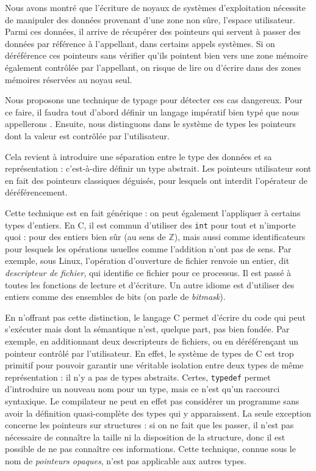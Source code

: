 
Nous avons montré que l'écriture de noyaux de systèmes d'exploitation nécessite
de manipuler des données provenant d'une zone non sûre, l'espace utilisateur.
Parmi ces données, il arrive de récupérer des pointeurs qui servent à passer des
données par référence à l'appellant, dans certains appels systèmes. Si on
déréférence ces pointeurs sans vérifier qu'ils pointent bien vers une zone
mémoire également contrôlée par l'appellant, on risque de lire ou d'écrire dans
des zones mémoires réservées au noyau seul.

Nous proposons une technique de typage pour détecter ces cas dangereux. Pour ce
faire, il faudra tout d'abord définir un langage impératif bien typé que nous
appellerons \langname. Ensuite, nous distinguons dans le système de types les
pointeurs dont la valeur est contrôlée par l'utilisateur.

Cela revient à introduire une séparation entre le type des données et sa
représentation : c'est-à-dire définir un type abstrait. Les pointeurs
utilisateur sont en fait des pointeurs classiques déguisés, pour lesquels ont
interdit l'opérateur de déréférencement.

Cette technique est en fait générique : on peut également l'appliquer à certains
types d'entiers. En C, il est commun d'utiliser des \texttt{int} pour tout et
n'importe quoi : pour des entiers bien sûr (au sens de $ℤ$), mais aussi comme
identificateurs pour lesquels les opérations usuelles comme l'addition n'ont pas
de sens. Par exemple, sous Linux, l'opération d'ouverture de fichier renvoie un
entier, dit \emph{descripteur de fichier}, qui identifie ce fichier pour ce
processus. Il est passé à toutes les fonctions de lecture et d'écriture. Un
autre idiome est d'utiliser des entiers comme des ensembles de bits (on parle de
\emph{bitmask}).


En n'offrant pas cette distinction, le langage C permet d'écrire du code qui
peut s'exécuter mais dont la sémantique n'est, quelque part, pas bien fondée.
Par exemple, en additionnant deux descripteurs de fichiers, ou en déréférençant
un pointeur contrôlé par l'utilisateur. En effet, le système de types de C est
trop primitif pour pouvoir garantir une véritable isolation entre deux types de
même représentation : il n'y a pas de types abstraits. Certes, \texttt{typedef}
permet d'introduire un nouveau nom pour un type, mais ce n'est qu'un raccourci
syntaxique. Le compilateur ne peut en effet pas considérer un programme sans
avoir la définition quasi-complète des types qui y apparaissent. La seule
exception concerne les pointeurs sur structures : si on ne fait que les passer,
il n'est pas nécessaire de connaître la taille ni la disposition de la
structure, donc il est possible de ne pas connaître ces informations. Cette
technique, connue sous le nom de \emph{pointeurs opaques}, n'est pas applicable
aux autres types.

